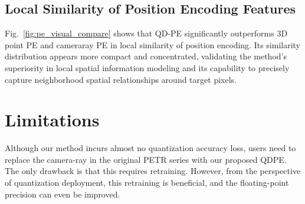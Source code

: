 \subsection{Local Similarity of Position Encoding Features}
Fig.~\ref{fig:pe_visual_compare} shows that QD-PE significantly outperforms 3D point PE and cameraray PE in local similarity of position encoding. Its similarity distribution appears more compact and concentrated, validating the method's superiority in local spatial information modeling and its capability to precisely capture neighborhood spatial relationships around target pixels.

\section{Limitations}
Although our method incurs almost no quantization accuracy loss, 
users need to replace the camera-ray in the original PETR series with our proposed QDPE. 
The only drawback is that this requires retraining. 
However, from the perspective of quantization deployment,
this retraining is beneficial, 
and the floating-point precision can even be improved.
